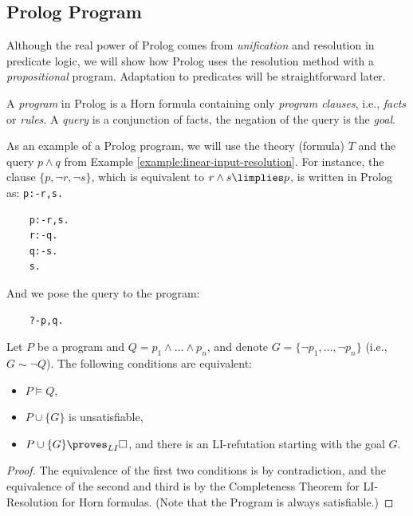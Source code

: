 
\subsection{Prolog Program}

Although the real power of Prolog comes from \emph{unification} and resolution in predicate logic, we will show how Prolog uses the resolution method with a \emph{propositional} program. Adaptation to predicates will be straightforward later.

A \emph{program} in Prolog is a Horn formula containing only \emph{program clauses}, i.e., \emph{facts} or \emph{rules}. A \emph{query} is a conjunction of facts, the negation of the query is the \emph{goal}.

\begin{example}
As an example of a Prolog program, we will use the theory (formula) $T$ and the query $p\land q$ from Example \ref{example:linear-input-resolution}. For instance, the clause $\{p,\neg r,\neg s\}$, which is equivalent to $r\land s\limplies p$, is written in Prolog as: \texttt{p:-r,s.}
\begin{verbatim}
    p:-r,s.
    r:-q.
    q:-s.
    s.    
\end{verbatim}
And we pose the query to the program:
\begin{verbatim}
    ?-p,q.    
\end{verbatim}
\end{example}

\begin{corollary}\label{corollary:propositional-prolog}
    Let $P$ be a program and $Q=p_1\land\dots\land p_n$, and denote $G=\{\neg p_1,\dots,\neg p_n\}$ (i.e., $G\sim \neg Q$). The following conditions are equivalent:
    \begin{itemize}
        \item $P\models Q$,
        \item $P\cup\{G\}$ is unsatisfiable,
        \item $P\cup\{G\}\proves_{LI}\square$, and there is an LI-refutation starting with the goal $G$.
    \end{itemize}
\end{corollary}
\begin{proof}
    The equivalence of the first two conditions is by contradiction, and the equivalence of the second and third is by the Completeness Theorem for LI-Resolution for Horn formulas. (Note that the Program is always satisfiable.)
\end{proof}

